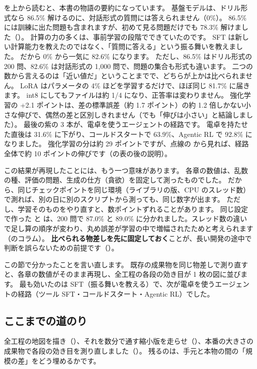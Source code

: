 を上から読むと、本書の物語の要約になっています。
基盤モデルは、ドリル形式なら 86.5\% 解けるのに、対話形式の質問には答えられません（0\%）。
86.5\% には訓練に出た問題も含まれますが、初めて見る問題だけでも 78.3\% 解けました（）。
計算の力の多くは、事前学習の段階でできていたのです。
SFT は新しい計算能力を教えたのではなく、「質問に答える」という振る舞いを教えました。
だから 0\% から一気に 82.6\% になります。
ただし、86.5\% はドリル形式の 200 問、82.6\% は対話形式の 1,000 問で、問題の集合も形式も違います。
二つの数から言えるのは「近い値だ」ということまでで、どちらが上かは比べられません。
LoRA はパラメータの 4\% ほどを学習するだけで、ほぼ同じ 81.7\% に届きます。
int8 にしてもファイルは約 1/4 になり、正答率は変わりません。
強化学習の +2.1 ポイントは、差の標準誤差（約 1.7 ポイント）の約 1.2 倍しかない小さな伸びで、偶然の差と区別しきれません（でも「伸びは小さい」と結論しました）。
最後の紫の 3 本が、電卓を使うエージェントの経路です。
電卓を持たせた直後は 31.6\% に下がり、コールドスタートで 63.9\%、Agentic RL で 92.8\% になりました。
強化学習の分は約 29 ポイントですが、点線の  から見れば、経路全体で約 10 ポイントの伸びです（の表の後の説明）。

この結果が再現したことには、もう一つ意味があります。
各章の数値は、乱数の種、評価の問題、生成の仕方（貪欲）を固定して測ったものでした。
だから、同じチェックポイントを同じ環境（ライブラリの版、CPU のスレッド数）で測れば、別の日に別のスクリプトから測っても、同じ数字が出ます。
ただし、学習そのものをやり直すと、数ポイントずれることがあります。
同じ設定で作った  と  は、200 問で 87.0\% と 89.0\% に分かれました。スレッド数の違いで足し算の順序が変わり、丸め誤差が学習の中で増幅されたためと考えられます（のコラム）。
\textbf{比べられる物差しを先に固定しておく}ことが、長い開発の途中で判断を誤らないための前提です（）。

この節で分かったことを言い直します。
既存の成果物を同じ物差しで測り直すと、各章の数値がそのまま再現し、全工程の各段の効き目が 1 枚の図に並びます。
最も効いたのは SFT（振る舞いを教える）で、次が電卓を使うエージェントの経路（ツール SFT・コールドスタート・Agentic RL）でした。

\subsection*{ここまでの道のり}

全工程の地図を描き（）、それを数分で通す縮小版を走らせ（）、本番の大きさの成果物で各段の効き目を測り直しました（）。
残るのは、手元と本物の間の「規模の差」をどう埋めるかです。

